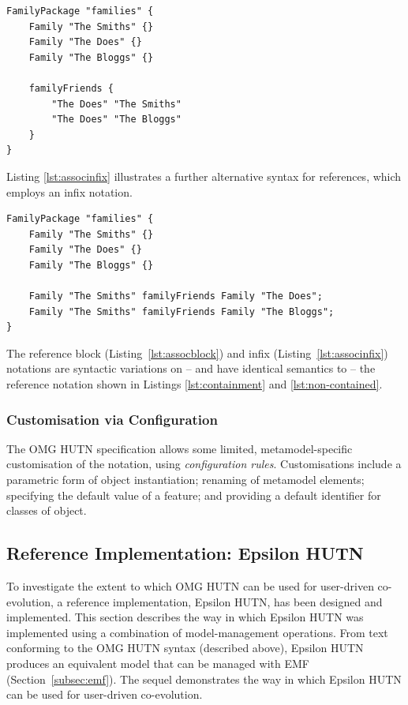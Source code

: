 \begin{lstlisting}[caption={[Using a reference block in HUTN]Using a reference block in HUTN, taken from \cite{rose08hutn}}, label=lst:assocblock, language=HutnFamilies]
FamilyPackage "families" {
    Family "The Smiths" {}
    Family "The Does" {}
    Family "The Bloggs" {}
    
    familyFriends {
        "The Does" "The Smiths"
        "The Does" "The Bloggs"
    }
}
\end{lstlisting}

Listing \ref{lst:associnfix} illustrates a further alternative syntax for references, which employs an infix notation. 

\begin{lstlisting}[caption={[Using an infix reference in HUTN]Using an infix reference in HUTN, taken from \cite{rose08hutn}}, label=lst:associnfix, language=HutnFamilies]
FamilyPackage "families" {
    Family "The Smiths" {}
    Family "The Does" {}
    Family "The Bloggs" {}
    
    Family "The Smiths" familyFriends Family "The Does";
    Family "The Smiths" familyFriends Family "The Bloggs";
}
\end{lstlisting}

The reference block (Listing~\ref{lst:assocblock}) and infix (Listing~\ref{lst:associnfix}) notations are syntactic variations on -- and have identical semantics to -- the reference notation shown in Listings \ref{lst:containment} and \ref{lst:non-contained}.


\subsubsection{Customisation via Configuration}
The OMG HUTN specification allows some limited, metamodel-specific customisation of the notation, using \emph{configuration rules}. Customisations include a parametric form of object instantiation; renaming of metamodel elements; specifying the default value of a feature; and providing a default identifier for classes of object.


\subsection{Reference Implementation: Epsilon HUTN}
\label{subsec:epsilon_hutn}
To investigate the extent to which OMG HUTN can be used for user-driven co-evolution, a reference implementation, Epsilon HUTN, has been designed and implemented. This section describes the way in which Epsilon HUTN was implemented using a combination of model-management operations. From text conforming to the OMG HUTN syntax (described above), Epsilon HUTN produces an equivalent model that can be managed with EMF (Section~\ref{subsec:emf}). The sequel demonstrates the way in which Epsilon HUTN can be used for user-driven co-evolution.

